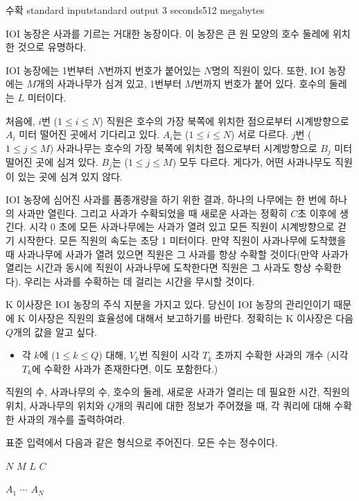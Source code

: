 \begin{problem}{수확}
	{standard input}{standard output}
	{3 seconds}{512 megabytes}{}
	
	IOI 농장은 사과를 기르는 거대한 농장이다. 이 농장은 큰 원 모양의 호수 둘레에 위치한 것으로 유명하다.
	
	IOI 농장에는 1번부터 $N$번까지 번호가 붙어있는 $N$명의 직원이 있다. 또한, IOI 농장에는 $M$개의 사과나무가 심겨 있고, 1번부터 $M$번까지 번호가 붙어 있다. 호수의 둘레는 $L$ 미터이다.
	
	처음에, $i$번 ($1 \le i \le N$) 직원은 호수의 가장 북쪽에 위치한 점으로부터 시계방향으로 $A_i$ 미터 떨어진 곳에서 기다리고 있다. $A_i$는 ($1 \le i \le N$) 서로 다르다. $j$번 ($1 \le j \le M$) 사과나무는 호수의 가장 북쪽에 위치한 점으로부터 시계방향으로 $B_j$ 미터 떨어진 곳에 심겨 있다. $B_j$는 ($1 \le j \le M$) 모두 다르다. 게다가, 어떤 사과나무도 직원이 있는 곳에 심겨 있지 않다.
	
	IOI 농장에 심어진 사과를 품종개량을 하기 위한 결과, 하나의 나무에는 한 번에 하나의 사과만 열린다. 그리고 사과가 수확되었을 때 새로운 사과는 정확히 $C$초 이후에 생긴다. 시각 0 초에 모든 사과나무에는 사과가 열려 있고 모든 직원이 시계방향으로 걷기 시작한다. 모든 직원의 속도는 초당 1 미터이다. 만약 직원이 사과나무에 도착했을 때 사과나무에 사과가 열려 있으면 직원은 그 사과를 항상 수확할 것이다(만약 사과가 열리는 시간과 동시에 직원이 사과나무에 도착한다면 직원은 그 사과도 항상 수확한다). 우리는 사과를 수확하는 데 걸리는 시간을 무시할 것이다.
	
	K 이사장은 IOI 농장의 주식 지분을 가지고 있다. 당신이 IOI 농장의 관리인이기 때문에 K 이사장은 직원의 효율성에 대해서 보고하기를 바란다. 정확히는 K 이사장은 다음 $Q$개의 값을 알고 싶다.
	
	\begin{itemize}
		\item[] 각 $k$에 ($1 \le k \le Q$) 대해, $V_k$번 직원이 시각 $T_k$ 초까지 수확한 사과의 개수 (시각 $T_k$에 수확한 사과가 존재한다면, 이도 포함한다.)
	\end{itemize}
	
	직원의 수, 사과나무의 수, 호수의 둘레, 새로운 사과가 열리는 데 필요한 시간, 직원의 위치, 사과나무의 위치와 $Q$개의 쿼리에 대한 정보가 주어졌을 때, 각 쿼리에 대해 수확한 사과의 개수를 출력하여라.
	
	
	\InputFile
	
	표준 입력에서 다음과 같은 형식으로 주어진다. 모든 수는 정수이다.
	
	$N$ $M$ $L$ $C$
	
	$A_1$ $\cdots$ $A_N$
	

\end{problem}
